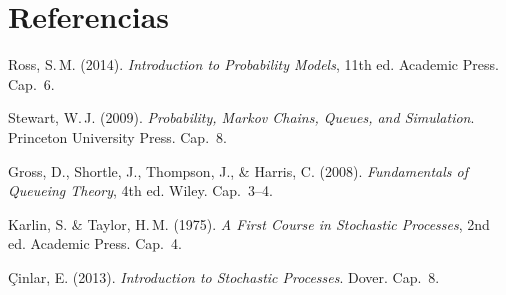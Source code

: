 \documentclass[11pt, letterpaper]{article}
\begin{document}
\section*{Referencias}
\begin{enumerate}[label={[\arabic*]}]
    \item Ross, S.\,M. (2014). \textit{Introduction to Probability Models}, 11th ed. Academic Press. Cap.~6.
    \item Stewart, W.\,J. (2009). \textit{Probability, Markov Chains, Queues, and Simulation}. Princeton University Press. Cap.~8.
    \item Gross, D., Shortle, J., Thompson, J., \& Harris, C. (2008). \textit{Fundamentals of Queueing Theory}, 4th ed. Wiley. Cap.~3--4.
    \item Karlin, S. \& Taylor, H.\,M. (1975). \textit{A First Course in Stochastic Processes}, 2nd ed. Academic Press. Cap.~4.
    \item \c{C}inlar, E. (2013). \textit{Introduction to Stochastic Processes}. Dover. Cap.~8.
\end{enumerate}
\end{document}
